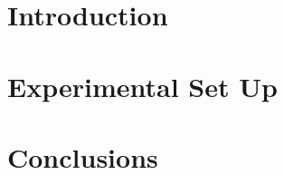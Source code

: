\documentclass[11pt,letterpaper,oneside]{book}
\begin{document}
\frontmatter

%   

\begin{dedication} 
  
\end{dedication}
\newpage

\begin{abstract}
  
\end{abstract}
\newpage

\begin{acknowledgements}
  
\end{acknowledgements}
\newpage

\tableofcontents
\listoffigures
\listoftables

\newpage


\newpage

\newpage

\mainmatter

\chapter{Introduction}

\chapter{Experimental Set Up}


\chapter{Conclusions}

\appendix

\backmatter





\end{document}
